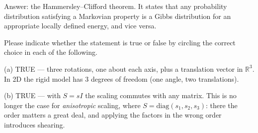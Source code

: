 \documentclass[11pt]{exam}
\newcommand{\TFT}{\ifprintanswers\textbf{TRUE}\hspace{1.1em}False\else True\hspace{1.1em}False\fi}
\newcommand{\TFF}{True\hspace{1.1em}\ifprintanswers\textbf{FALSE}\else False\fi}
\newcommand{\answerspace}[1]{\ifprintanswers\else\vspace{#1}\fi}
\begin{document}
\begin{questions}
\begin{parts}
  \begin{solution}
    Answer: the Hammersley--Clifford theorem. It states that any probability distribution
    satisfying a Markovian property is a Gibbs distribution for an appropriate locally defined
    energy, and vice versa.
  \end{solution}
\answerspace{1.8cm}
\end{parts}

\question
Please indicate whether the statement is true or false by circling the correct choice in each of
the following.


\begin{solution}
  (a) TRUE --- three rotations, one about each axis, plus a translation vector in $\mathbb{R}^3$.
  In 2D the rigid model has 3 degrees of freedom (one angle, two translations).

  (b) TRUE --- with $S = sI$ the scaling commutes with any matrix. This is no longer the case for
  \emph{anisotropic} scaling, where $S = \mathrm{diag}(s_1, s_2, s_3)$: there the order matters a
  great deal, and applying the factors in the wrong order introduces shearing.


\end{solution}
\end{questions}
\end{document}
